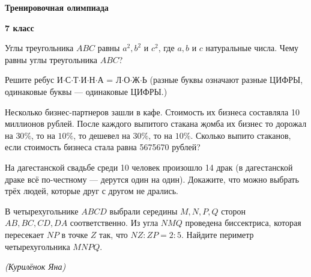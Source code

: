 \centerline{\bf \Huge Тренировочная олимпиада}
\centerline{\bf \Huge 7 класс}

\begin{flushright}
        \scriptsize{}
\end{flushright}

Углы треугольника $ABC$ равны $a^2, b^2$ и $c^2$, где $a, b$ и $c$ натуральные числа. Чему равны углы треугольника $ABC$?

Решите ребус И$\cdot$С$\cdot$Т$\cdot$И$\cdot$Н$\cdot$А = Л$\cdot$О$\cdot$Ж$\cdot$Ь (разные буквы означают разные ЦИФРЫ, одинаковые буквы --- одинаковые ЦИФРЫ.)

Несколько бизнес-партнеров зашли в кафе. Стоимость их бизнеса составляла 10 миллионов рублей. После каждого выпитого стакана җомба их бизнес то дорожал на $30 \%$, то на $10 \%$, то дешевел на $30 \%$, то на $10 \%$. Сколько выпито стаканов, если стоимость бизнеса стала равна 5675670 рублей?

На дагестанской свадьбе среди 10 человек произошло 14 драк (в дагестанской драке всё по-честному --- дерутся один на один). Докажите, что можно выбрать трёх людей, которые друг с другом не дрались.

В четырехугольнике $ABCD$ выбрали середины $M, N, P, Q$ сторон $AB, BC, CD, DA$ соответственно. Из угла $NMQ$ проведена биссектриса, которая пересекает $NP$ в точке $Z$ так, что $NZ:ZP=2:5.$ Найдите периметр четырехугольника $MNPQ$.

\begin{flushright}
    \scriptsize{\it (Курилёнок Яна)}
\end{flushright}